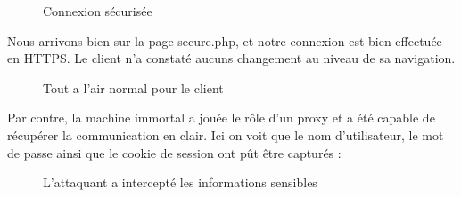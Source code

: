 \begin{figure}[H]
  \caption{Connexion sécurisée}
\end{figure}

Nous arrivons bien sur la page secure.php, et notre connexion est bien effectuée en HTTPS. Le client n'a constaté aucuns changement au niveau de sa navigation.

\begin{figure}[H]
  \caption{Tout a l'air normal pour le client}
\end{figure}

Par contre, la machine immortal a jouée le rôle d'un proxy et a été capable de récupérer la communication en clair. Ici on voit que le nom d'utilisateur, le mot de passe ainsi que le cookie de session ont pût être capturés :

\begin{figure}[H]
  \caption{L'attaquant a intercepté les informations sensibles}
\end{figure}
